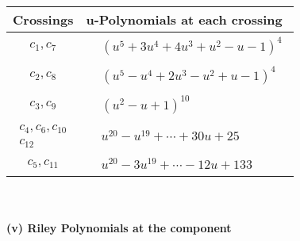 \documentclass[1p]{elsarticle_modified}
\theoremstyle{definition}
\begin{document}
\begin{tabular}{m{50pt}|m{274pt}}
Crossings & \hspace{64pt}u-Polynomials at each crossing \\
\hline $$\begin{aligned}c_{1},c_{7}\end{aligned}$$&$\begin{aligned}
&(u^5+3 u^4+4 u^3+u^2- u-1)^4
\end{aligned}$\\
\hline $$\begin{aligned}c_{2},c_{8}\end{aligned}$$&$\begin{aligned}
&(u^5- u^4+2 u^3- u^2+u-1)^4
\end{aligned}$\\
\hline $$\begin{aligned}c_{3},c_{9}\end{aligned}$$&$\begin{aligned}
&(u^2- u+1)^{10}
\end{aligned}$\\
\hline $$\begin{aligned}c_{4},c_{6},c_{10}\\c_{12}\end{aligned}$$&$\begin{aligned}
&u^{20}- u^{19}+\cdots+30 u+25
\end{aligned}$\\
\hline $$\begin{aligned}c_{5},c_{11}\end{aligned}$$&$\begin{aligned}
&u^{20}-3 u^{19}+\cdots-12 u+133
\end{aligned}$\\
\hline
\end{tabular}\\~\\
\newpage\renewcommand{\arraystretch}{1}
\flushleft \textbf{(v) Riley Polynomials at the component}\newline \\
\end{document}
